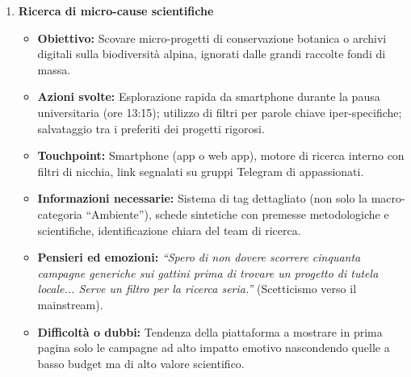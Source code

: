 \documentclass[11pt,a4paper]{article}
\begin{document}
    \begin{enumerate}

        \item \textbf{Ricerca di micro-cause scientifiche}
        \begin{itemize}
            \item \textbf{Obiettivo:} Scovare micro-progetti di conservazione botanica o archivi digitali sulla biodiversità alpina, ignorati dalle grandi raccolte fondi di massa.
            \item \textbf{Azioni svolte:} Esplorazione rapida da smartphone durante la pausa universitaria (ore 13:15); utilizzo di filtri per parole chiave iper-specifiche; salvataggio tra i preferiti dei progetti rigorosi.
            \item \textbf{Touchpoint:} Smartphone (app o web app), motore di ricerca interno con filtri di nicchia, link segnalati su gruppi Telegram di appassionati.
            \item \textbf{Informazioni necessarie:} Sistema di tag dettagliato (non solo la macro-categoria ``Ambiente''), schede sintetiche con premesse metodologiche e scientifiche, identificazione chiara del team di ricerca.
            \item \textbf{Pensieri ed emozioni:} \textit{``Spero di non dovere scorrere cinquanta campagne generiche sui gattini prima di trovare un progetto di tutela locale... Serve un filtro per la ricerca seria.''} (Scetticismo verso il mainstream).
            \item \textbf{Difficoltà o dubbi:} Tendenza della piattaforma a mostrare in prima pagina solo le campagne ad alto impatto emotivo nascondendo quelle a basso budget ma di alto valore scientifico.
        \end{itemize}


\end{enumerate}
\end{document}
